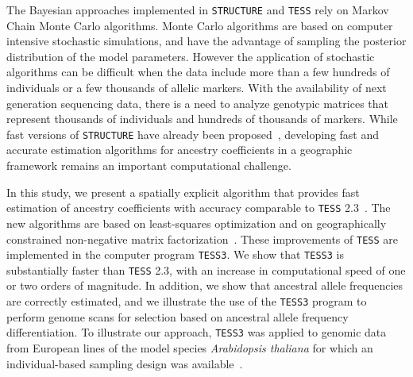 The Bayesian approaches implemented in {\tt STRUCTURE} and {\tt TESS} rely on Markov Chain Monte Carlo algorithms. Monte Carlo algorithms are based on computer intensive stochastic simulations, and have the advantage of sampling the posterior distribution of the model parameters. However the application of stochastic algorithms can be difficult when the data include more than a few hundreds of individuals or a few thousands of allelic markers. With the availability of next generation sequencing data, there is a need to analyze genotypic matrices that represent thousands of individuals and hundreds of thousands of markers. While fast versions of {\tt STRUCTURE} have already been proposed~\citep{raj2014faststructure, frichot2014fast, alexander2011linking, wollstein2015detecting}, developing fast and accurate estimation algorithms for ancestry coefficients in a geographic framework remains an important computational challenge.

In this study, we present a spatially explicit algorithm that provides fast estimation of ancestry coefficients with accuracy comparable to {\tt TESS} 2.3~\citep{durand2009spatial}. The new algorithms are based on least-squares optimization and on geographically constrained non-negative matrix factorization~\citep{cai2011graph,frichot2014fast}. These improvements of {\tt TESS} are implemented in the computer program {\tt TESS3}. We show that {\tt TESS3} is substantially faster than {\tt TESS} 2.3, with an increase in computational speed of one or two orders of magnitude. In addition, we show that ancestral allele frequencies are correctly estimated, and we illustrate the use of the {\tt TESS3} program to perform genome scans for selection based on ancestral allele frequency differentiation. To illustrate our approach, {\tt TESS3} was applied to genomic data from European lines of the model species {\it Arabidopsis thaliana} for which an individual-based sampling design was available~\citep{atwell2010genome}.




















